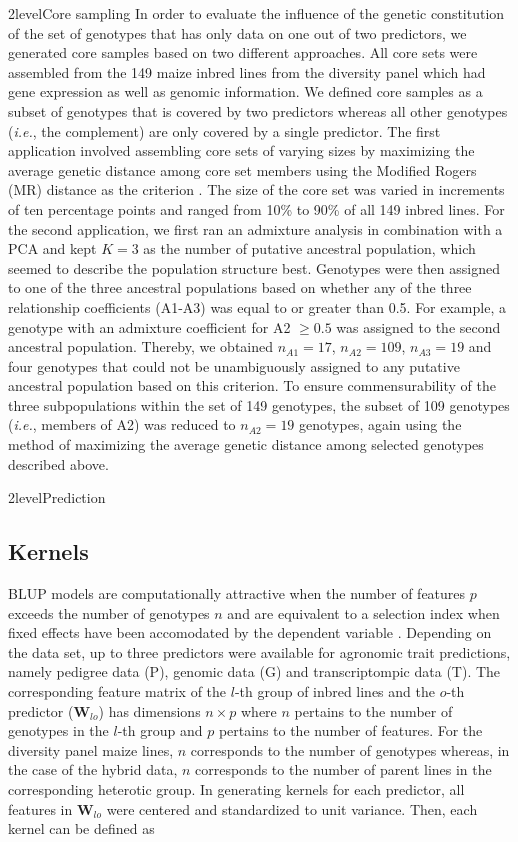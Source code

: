 \documentclass[12pt,titlepage]{article}
\begin{document}
\Genetics2level{Core sampling}
In order to evaluate the influence of the genetic constitution of the set of
genotypes that has only data on one out of two predictors, we generated core
samples based on two different approaches.
All core sets were assembled from the 149 maize inbred lines from the diversity
panel which had gene expression as well as genomic information.
We defined core samples as a subset of genotypes that is covered by two
predictors whereas all other genotypes (\textit{i.e.}, the complement) are only
covered by a single predictor.
The first application involved assembling core sets of varying sizes by 
maximizing the average genetic distance among core set members using the 
Modified Rogers (MR) distance as the criterion \cite{Thachuk2009}.
The size of the core set was varied in increments of ten percentage points and 
ranged from 10\% to 90\% of all 149 inbred lines.
For the second application, we first ran an admixture analysis in combination
with a PCA and kept $K=3$ as the number of putative ancestral population, which 
seemed to describe the population structure best.
Genotypes were then assigned to one of the three ancestral populations based on
whether any of the three relationship coefficients (A1-A3) was equal to or
greater than 0.5.
For example, a genotype with an admixture coefficient for A2 $\geq 0.5$ was
assigned to the second ancestral population.
Thereby, we obtained $n_{A1} = 17$, $n_{A2} = 109$, $n_{A3} = 19$ and four 
genotypes that could not be unambiguously assigned to any putative ancestral 
population based on this criterion.
To ensure commensurability of the three subpopulations within the set of 149
genotypes, the subset of 109 genotypes (\textit{i.e.}, members of A2) was
reduced to $n_{A2} = 19$ genotypes, again using the method of maximizing the
average genetic distance among selected genotypes described above.


\Genetics2level{Prediction}
\subsection{Kernels}
BLUP models are computationally attractive when the number of features $p$
exceeds the number of genotypes $n$ and are equivalent to a selection index
when fixed effects have been accomodated by the dependent variable 
\cite{Mrode2014}.
Depending on the data set, up to three predictors were available for agronomic
trait predictions, namely pedigree data (P), genomic data (G) and
transcriptompic data (T).
The corresponding feature matrix of the $l$-th group of inbred lines and the 
$o$-th predictor ($\mathbf{W}_{lo}$) has dimensions $n \times p$ where $n$
pertains to the number of genotypes in the $l$-th group and $p$ pertains to 
the number of features.
For the diversity panel maize lines, $n$ corresponds to the number of genotypes
whereas, in the case of the hybrid data, $n$ corresponds to the number of
parent lines in the corresponding heterotic group.
In generating kernels for each predictor, all features in $\mathbf{W}_{lo}$ were
centered and standardized to unit variance.
Then, each kernel can be defined as
\end{document}
